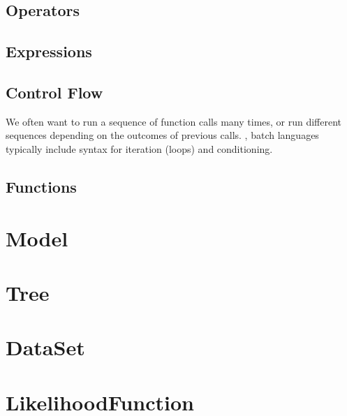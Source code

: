 \documentclass[12pt]{book}
\begin{document}
\section {Operators}

\section {Expressions}

\section {Control Flow}




We often want to run a sequence of function calls many times, or run different sequences depending on the outcomes of previous calls.  , batch languages typically include syntax for iteration (loops) and conditioning. 


\section {Functions}




\chapter {Model}


\chapter {Tree}


\chapter {DataSet}

\chapter {LikelihoodFunction}
\end{document}
